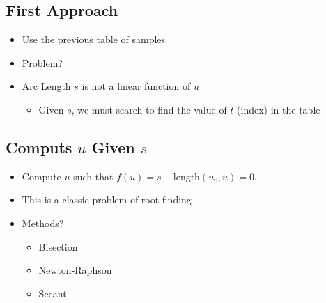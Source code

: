 \documentclass{article}
\begin{document}
\subsection*{First Approach}
\begin{itemize}
    \item Use the previous table of samples
    \item Problem?
    \item Arc Length $s$ is not a linear function of $u$
    \begin{itemize}
        \item Given $s$, we must search to find the value of $t$ (index) in the table
    \end{itemize}
\end{itemize}

\subsection*{Computs $u$ Given $s$}
\begin{itemize}
    \item Compute $u$ such that $f(u) = s - \text{length}(u_0, u) = 0$.
    \item This is a classic problem of root finding
    \item Methods?
    \begin{itemize}
        \item Bisection
        \item Newton-Raphson
        \item Secant
    \end{itemize}
\end{itemize}
\end{document}
